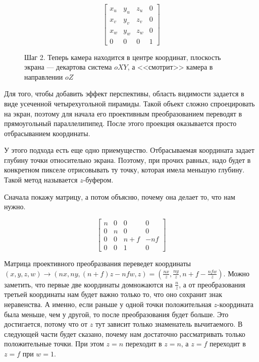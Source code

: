 \documentclass{article}
\begin{document}
$$
\begin{bmatrix}
x_u & y_u & z_u & 0 \\
x_v & y_v & z_v & 0 \\
x_w & y_w & z_w & 0 \\
0 & 0 & 0 & 1
\end{bmatrix}
$$

\begin{center}
\begin{figure}[H]
\caption{Шаг 2. Теперь камера находится в центре координат, плоскость экрана --- декартова система $oXY$, а <<смотрит>> камера в направлении $oZ$}
\label{ris:image}
\end{figure}
\end{center}


Для того, чтобы добавить эффект перспективы, область видимости задается в виде усеченной четырехугольной пирамиды. Такой объект сложно спроецировать на экран, поэтому для начала его проективным преобразованием переводят в прямоугольный параллелипипед. После этого проекция оказывается просто отбрасыванием координаты.

У этого подхода есть еще одно приемущество. Отбрасываемая координата задает глубину точки относительно экрана. Поэтому, при прочих равных, надо будет в конкретном пикселе отрисовывать ту точку, которая имела меньшую глубину. Такой метод называется $z$-буфером.

Сначала покажу матрицу, а потом объясню, почему она делает то, что нам  нужно.

$$
\begin{bmatrix}
n & 0 & 0 & 0 \\
0 & n & 0 & 0 \\
0 & 0 & n + f & -nf \\
0 & 0 & 1 & 0
\end{bmatrix}
$$

Матрица проективного преобразвания переведет координаты $(x, y, z, w) \to (nx, ny, (n + f)z - nfw, z) = (\frac{nx}{z}, \frac{ny}{z}, n + f - \frac{nfw}{z})$. Можно заметить, что первые две координаты домножаются на $\frac{n}{z}$, а от преобразования третьей координаты нам будет важно только то, что оно сохранит знак неравенства. А именно, если раньше у одной точки положительная $z$-координата была меньше, чем у другой, то после преобразования будет больше. Это достигается, потому что от $z$ тут зависит только знаменатель вычитаемого. В следующей части будет сказано, почему нам достаточно рассматривать только положительные точки. При этом $z = n$ переходит в $z = n$, а $z = f$ переходит в $z = f$ при $w = 1$.
\end{document}
